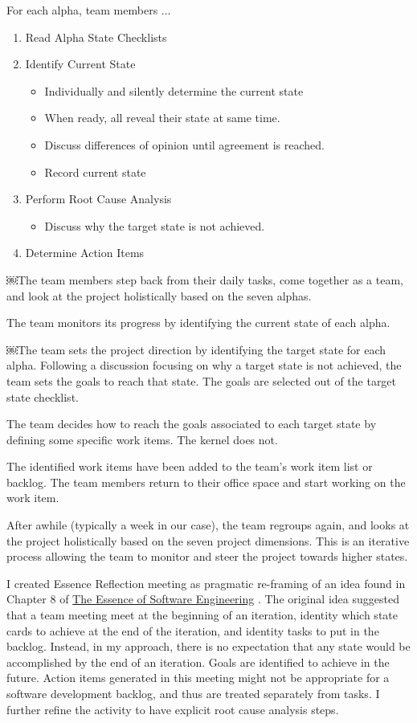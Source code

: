 \documentclass[preprint,12pt,3p]{elsarticle}
\begin{document}
For each alpha, team members ...
\begin{enumerate}
\item Read Alpha State Checklists
\item Identify Current State
    \begin{itemize}
    \item Individually and silently determine the current state
    \item When ready, all reveal their state at same time.
    \item Discuss differences of opinion until agreement is reached.
    \item Record current state
    \end{itemize}
\item Perform Root Cause Analysis
    \begin{itemize}
    \item Discuss why the target state is not achieved.
    \end{itemize}
\item Determine Action Items    
\end{enumerate}

￼The team members step back from their daily tasks, come together as a team, and look 
at the project holistically based on the seven alphas.

The team monitors its progress by identifying the current state of each alpha. 

￼The team sets the project direction by identifying the target state for each alpha. Following a discussion focusing on why a target state is not achieved, the team sets the goals to reach that state. The goals are selected out of the target state checklist.

The team decides how to reach the goals associated to each target state by defining some specific work items. The kernel does not.

The identified work items have been added to the team’s work item list or backlog. The team members return to their office space and start working on the work item. 

After awhile (typically a week in our case), the team regroups again, and looks at the project holistically based on the seven project dimensions. This is an iterative process allowing the team to monitor and steer the project towards higher states.

I created Essence Reflection meeting as pragmatic re-framing of an idea found in Chapter 8 of \underline{The Essence of Software Engineering} \cite{EssenceBook}. The original idea suggested that a team meeting meet at the beginning of an iteration, identity which state cards to achieve at the end of the iteration, and identity tasks to put in the backlog. Instead, in my approach, there is no expectation that any state would be accomplished by the end of an iteration. Goals are identified to achieve in the future. Action items generated in this meeting might not be appropriate for a software development backlog, and thus are treated separately from tasks. I further refine the activity to have explicit root cause analysis steps. 
\end{document}
